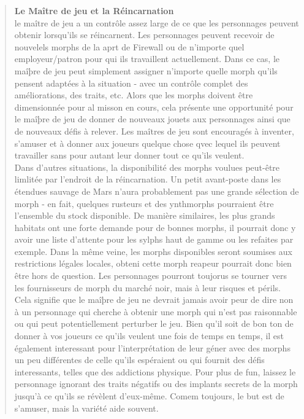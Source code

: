 \begin{quotation} \textbf{Le Maître de jeu et la Réincarnation} \\ le maître de jeu a un contrôle assez large de ce que les personnages peuvent obtenir lorsqu'ils se réincarnent. Les personnages peuvent recevoir de nouvelels morphs de la aprt de Firewall ou de n'importe quel employeur/patron pour qui ils travaillent actuellement. Dans ce cas, le maîþre de jeu peut simplement assigner n'importe quelle morph qu'ils pensent adaptées à la situation - avec un contrôle complet des améliorations, des traits, etc. Alors que les morphs doivent être dimensionnée pour al misson en cours, cela présente une opportunité pour le maîþre de jeu de donner de nouveaux jouets aux personnages ainsi que de nouveaux défis à relever. Les maîtres de jeu sont encouragés à inventer, s'amuser et à donner aux joueurs quelque chose qvec lequel ils peuvent travailler sans pour autant leur donner tout ce qu'ils veulent.\\ Dans d'autres situations, la disponibilité des morphs voulues peut-être limlitée par l'endroit de la réincarnation. Un petit avant-poste dans les étendues sauvage de Mars n'aura probablement pas une grande sélection de morph - en fait, quelques rusteurs et des ynthmorphs pourraient être l'ensemble du stock disponible. De manière similaires, les plus grands habitats ont une forte demande pour de bonnes morphs, il pourrait donc y avoir une liste d'attente pour les sylphs haut de gamme ou les refaites par exemple. Dans la même veine, les morphs disponibles seront soumises aux restrictions légales locales, obteni cette morph reapeur pourrait donc bien être hors de question. Les personnages pourront toujorus se tourner vers les fournisseurs de morph du marché noir, mais à leur risques et périls.\\ Cela signifie que le maîþre de jeu ne devrait jamais avoir peur de dire non à un personnage qui cherche à obtenir une morph qui n'est pas raisonnable ou qui peut potentiellement perturber le jeu. Bien qu'il soit de bon ton de donner à vos joueurs ce qu'ils veulent une fois de temps en temps, il est également interessant pour l'interprétation de leur géner avec des morphs un peu différentes de celle qu'ils espéraient ou qui fournit des défis interessants, telles que des addictions physique. Pour plus de fun, laissez le personnage ignorant des traits négatifs ou des implants secrets de la morph jusqu'à ce qu'ils se révèlent d'eux-même. Comem toujours, le but est de s'amuser, mais la variété aide souvent. \end{quotation} 

